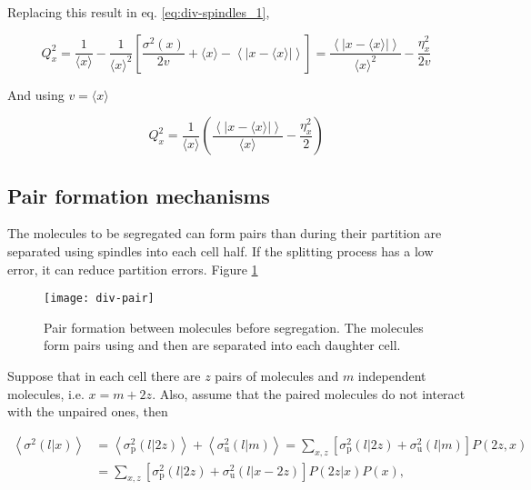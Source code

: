 Replacing this result in eq. \eqref{eq:div-spindles_1},

\begin{equation*}
  Q_x^2 = \frac{1}{\langle x\rangle}-\frac{1}{\langle x\rangle^2}\left[\frac{\sigma^2(x)}{2v}+\langle x\rangle-\left\langle\left|x-\langle x\rangle\right|\right\rangle\right] = \frac{\left\langle\left|x-\langle x\rangle\right|\right\rangle}{\langle x\rangle^2}-\frac{\eta_x^2}{2v}
\end{equation*}

And using $v=\langle x\rangle$

\begin{equation*}
  Q_x^2 = \frac{1}{\langle x\rangle}\left(\frac{\left\langle\left|x-\langle x\rangle\right|\right\rangle}{\langle x\rangle}-\frac{\eta_x^2}{2}\right)
\end{equation*}

\subsection{Pair formation mechanisms}

The molecules to be segregated can form pairs than during their partition are separated using spindles into each cell half. If the splitting process has a low error, it can reduce partition errors. Figure \ref{fig:div-pair}

\begin{figure}[H]
  \centering
  \texttt{[image: div-pair]}
  \caption[Pair formation between molecules before segregation]{\label{fig:div-pair}Pair formation between molecules before segregation. The molecules form pairs using and then are separated into each daughter cell.}
\end{figure}

Suppose that in each cell there are $z$ pairs of molecules and $m$ independent molecules, i.e. $x=m+2z$. Also, assume that the paired molecules do not interact with the unpaired ones, then

\begin{equation}
  \label{eq:div-pu}
  \begin{split}
    \left\langle\sigma^2(l|x)\right\rangle &= \left\langle\sigma^2_\text{p}(l|2z)\right\rangle + \left\langle\sigma^2_\text{u}(l|m)\right\rangle = \sum_{x,z}\left[\sigma^2_\text{p}(l|2z) + \sigma^2_\text{u}(l|m)\right]P(2z,x)\\
    &= \sum_{x,z}\left[\sigma^2_\text{p}(l|2z) + \sigma^2_\text{u}(l|x-2z)\right]P(2z|x)P(x),
  \end{split}
\end{equation}

